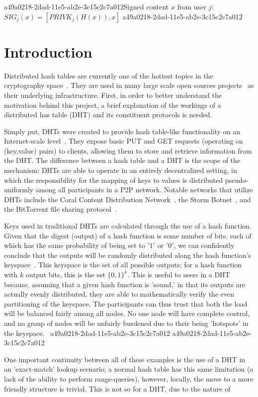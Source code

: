 \documentclass[12pt]{article}
\begin{document}
a49a0218-2dad-11e5-ab2e-3c15c2c7a012Signed content $x$ from user $j$: $SIG_j(x) = \left[ PRIVK_j( H(x) ), x \right]$
a49a0218-2dad-11e5-ab2e-3c15c2c7a012
\section{Introduction}
\par Distributed hash tables are currently one of the hottest topics in the cryptography space~\cite{Stoica:2001dj,Rowstron:2001ea,Ratnasamy:2001wn}. They are used in many large scale open sources projects~\cite{Freitas:2013tb,Xu:2010vs,Perfitt:2010fh} as their underlying infrastructure. First, in order to better understand the motivation behind this project, a brief explanation of the workings of a distributed has table (DHT) and its constituent protocols is needed.

\par Simply put, DHTs were created to provide hash table-like functionality on an Internet-scale level~\cite{Ratnasamy:2001wn}. They expose basic PUT and GET requests (operating on (key,value) pairs) to clients, allowing them to store and retrieve information from the DHT. The difference between a hash table and a DHT is the scope of the mechanism: DHTs are able to operate in an entirely decentralized setting, in which the responsibility for the mapping of keys to values is distributed pseudo-uniformly among all participants in a P2P network. Notable networks that utilize DHTs include the Coral Content Distribution Network~\cite{Freedman:2004vb}, the Storm Botnet~\cite{Holz:2008uk}, and the BitTorrent file sharing protocol~\cite{Cohen:y1_8mBnw}.

\par Keys used in traditional DHTs are calculated through the use of a hash function. Given that the digest (output) of a hash function is some number of bits, each of which has the same probability of being set to $'1'$ or $'0'$, we can confidently conclude that the outputs will be randomly distributed along the hash function's keyspace~. This keyspace is the set of all possible outputs; for a hash function with $k$ output bits, this is the set $\{0,1\}^k$. This is useful to users in a DHT because, assuming that a given hash function is 'sound,' in that its outputs are actually evenly distributed, they are able to mathematically verify the even partitioning of the keyspace. The participants can thus trust that both the load will be balanced fairly among all nodes. No one node will have complete control, and no group of nodes will be unfairly burdened due to their being 'hotspots' in the keyspace.~
a49a0218-2dad-11e5-ab2e-3c15c2c7a012
a49a0218-2dad-11e5-ab2e-3c15c2c7a012\par One important continuity between all of these examples is the use of a DHT in an 'exact-match' lookup scenario; a normal hash table has this same limitation (a lack of the ability to perform range-queries), however, locally, the move to a more friendly structure is trivial. This is not so for a DHT, due to the nature of
\printbibliography
\end{document}
